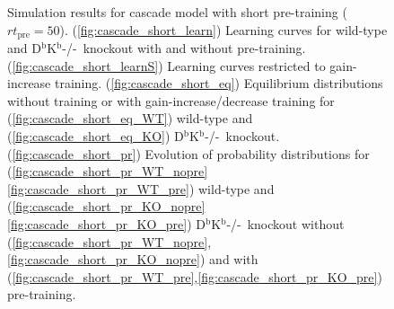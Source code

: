\documentclass[12pt]{article}
\newcommand{\KO}{D$^\mathrm{b}$K$^\mathrm{b}$-/-}
\begin{document}
\begin{figure}
 \begin{center}
 \begin{myenuma}
  \item{}\label{fig:cascade_short_learn}
  \item{}\label{fig:cascade_short_learnS}
  \item\label{fig:cascade_short_eq}\begin{myenumi}
                    \item{}\label{fig:cascade_short_eq_WT}
                    \item{}\label{fig:cascade_short_eq_KO}
                  \end{myenumi}
  \item\label{fig:cascade_short_pr}\begin{myenumi}
                    \item{}\label{fig:cascade_short_pr_WT_nopre}
                    \item{}\label{fig:cascade_short_pr_WT_pre}
                    \item{}\label{fig:cascade_short_pr_KO_nopre}
                    \item{}\label{fig:cascade_short_pr_KO_pre}
                  \end{myenumi}
 \end{myenuma}
 \end{center}
  \caption{Simulation results for cascade model with short pre-training ($rt_\text{pre}=50$).
  (\ref{fig:cascade_short_learn}) Learning curves for wild-type and \KO\ knockout with and without pre-training.
  (\ref{fig:cascade_short_learnS}) Learning curves restricted to gain-increase training.
  (\ref{fig:cascade_short_eq}) Equilibrium distributions without training or with gain-increase/decrease training for (\ref{fig:cascade_short_eq_WT}) wild-type and (\ref{fig:cascade_short_eq_KO}) \KO\ knockout.
  (\ref{fig:cascade_short_pr}) Evolution of probability distributions for (\ref{fig:cascade_short_pr_WT_nopre}\ref{fig:cascade_short_pr_WT_pre}) wild-type and  (\ref{fig:cascade_short_pr_KO_nopre}\ref{fig:cascade_short_pr_KO_pre}) \KO\ knockout without (\ref{fig:cascade_short_pr_WT_nopre},\ref{fig:cascade_short_pr_KO_nopre}) and with (\ref{fig:cascade_short_pr_WT_pre},\ref{fig:cascade_short_pr_KO_pre}) pre-training. } \label{fig:cascade_short}
\end{figure}
\end{document}
